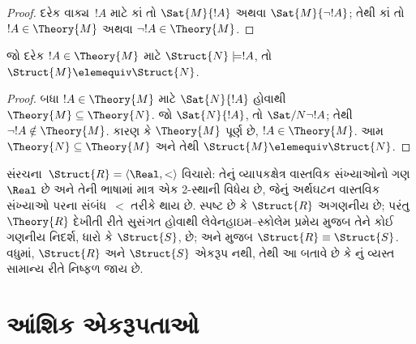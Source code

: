 \begin{proof}
દરેક વાક્ય~$!A$ માટે કાં તો $\Sat{M}{!A}$ અથવા
$\Sat{M}{\lnot !A}$; તેથી કાં તો $!A \in \Theory{M}$ અથવા
$\lnot !A \in \Theory{M}$.
\end{proof}

\begin{prop}
  જો દરેક $!A \in \Theory{M}$ માટે $\Struct{N} \models !A$, તો
  $\Struct{M} \elemequiv \Struct{N}$.
\end{prop}

\begin{proof}
બધા $!A \in \Theory{M}$ માટે $\Sat{N}{!A}$ હોવાથી $\Theory{M}
\subseteq \Theory{N}$. જો $\Sat{N}{!A}$, તો
$\Sat/{N}{\lnot !A}$; તેથી $\lnot !A \notin \Theory{M}$. કારણ કે
$\Theory{M}$ પૂર્ણ છે, $!A \in \Theory{M}$. આમ $\Theory{N}
\subseteq \Theory{M}$ અને તેથી $\Struct{M} \elemequiv \Struct{N}$.
\end{proof}

\begin{rem}
  સંરચના~$\Struct{R} = \langle\Real, <\rangle$ વિચારો: તેનું
  વ્યાપકક્ષેત્ર વાસ્તવિક સંખ્યાઓનો ગણ $\Real$ છે અને તેની ભાષામાં માત્ર એક
  2-સ્થાની વિધેય છે, જેનું અર્થઘટન વાસ્તવિક સંખ્યાઓ પરના
  સંબંધ~$<$ તરીકે થાય છે. સ્પષ્ટ છે કે $\Struct{R}$ અગણનીય
  છે; પરંતુ $\Theory{R}$ દેખીતી રીતે સુસંગત હોવાથી લેવેનહાઇમ--સ્કોલેમ
  પ્રમેય મુજબ તેને કોઈ ગણનીય નિદર્શ, ધારો કે $\Struct{S}$,
  છે; અને  મુજબ $\Struct{R} \equiv \Struct{S}$.
  વધુમાં, $\Struct{R}$ અને $\Struct{S}$ એકરૂપ નથી, તેથી આ બતાવે છે કે
  નું વ્યસ્ત સામાન્ય રીતે નિષ્ફળ જાય છે.
\end{rem}
\endgroup


\begingroup
\makeatletter{}\makeatother

\section{આંશિક એકરૂપતાઓ}
\label{guunit:OLP-0189}


